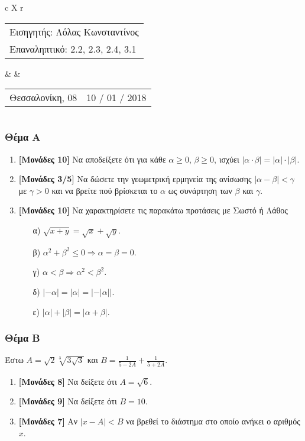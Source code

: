\documentclass[12pt]{article}
\begin{document}
\begin{table}
    \small
    \begin{tabularx}{\textwidth}{ c X r }
      \begin{tabular}{ l }
        Εισηγητής: Λόλας Κωνσταντίνος \\
        Επαναληπτικό: 2.2, 2.3, 2.4, 3.1
      \end{tabular}
      & &
      \begin{tabular}{ r }
        Θεσσαλονίκη, 08 & 10 / 01 / 2018
      \end{tabular}
    \end{tabularx}
\end{table}

\part*{}

\section*{Θέμα Α}
  \noindent
  \begin{enumerate}
    \item \textbf{[Μονάδες 10]} Να αποδείξετε ότι για κάθε $α\ge 0$, $β\ge 0$, ισχύει $| α\cdot β | =|α|\cdot |β|$.
    \item \textbf{[Μονάδες 3/5]} Να δώσετε την γεωμετρική ερμηνεία της ανίσωσης $|α-β|<γ$ με $γ>0$ και να βρείτε πού βρίσκεται το $α$ ως συνάρτηση των $β$ και $γ$.
    \item \textbf{[Μονάδες 10]} Να χαρακτηρίσετε τις παρακάτω προτάσεις με Σωστό ή Λάθος
    \begin{enumerate}
      \item [α)] $\sqrt{x+y}=\sqrt{x}+\sqrt{y}$.
      \item [β)] $α^2+β^2\le 0 \Rightarrow α=β=0$.
      \item [γ)] $α<β \Rightarrow α^2<β^2$.
      \item [δ)] $|-α|=|α|=\left| -|α| \right|$.
      \item [ε)] $|α|+|β|=|α+β|$.
    \end{enumerate}
  \end{enumerate}

\section*{Θέμα Β}
  \noindent
  Έστω $Α=\sqrt{2}\sqrt[3]{3\sqrt{3}}$ και $Β=\frac{1}{5-2Α}+\frac{1}{5+2Α}$.
  \begin{enumerate}
    \item \textbf{[Μονάδες 8]} Να δείξετε ότι $Α=\sqrt{6}$.
    \item \textbf{[Μονάδες 9]} Να δείξετε ότι $Β=10$.
    \item \textbf{[Μονάδες 7]} Αν $|x-A|<B$ να βρεθεί το διάστημα στο οποίο ανήκει ο αριθμός $x$.
  \end{enumerate}
\end{document}
